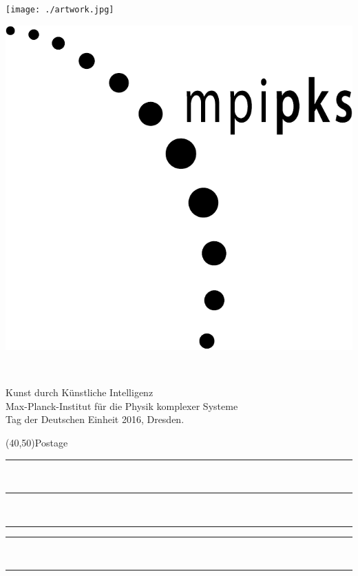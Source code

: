 \documentclass[a6paper,landscape,7pt]{scrartcl}
\begin{document}
\vspace*{-1cm} %
\vspace*{\fill}
\begin{center}
	\texttt{[image: ./artwork.jpg]}
\end{center}
\vfill

\clearpage


\begin{multicols}{2}
    \vspace*{\fill}
    \begin{minipage}{0.12\linewidth}
      \includegraphics[width=\textwidth]{./resources/postcards/MPIPKS_bw.pdf}
    \end{minipage}%
    $\quad$
    \begin{minipage}{0.8\linewidth}
      {\footnotesize
      Kunst durch Künstliche Intelligenz\\
      Max-Planck-Institut für die Physik komplexer Systeme\\
      Tag der Deutschen Einheit 2016, Dresden.
      }
    \end{minipage}%
    \columnbreak\par
    \hfill\framebox(40,50){\scriptsize Postage}\par
    \vspace{0.25\textheight}
    \rule{5.8cm}{0.01cm}\vspace*{1cm}\\ %
    \rule{5.8cm}{0.01cm}\vspace*{1cm}\\ %
    \rule{2.2cm}{0.01cm}\hspace*{0.2cm}\rule{3.4cm}{0.01cm}\vspace*{1cm}\\ %
    \rule{5.8cm}{0.01cm}\\ %
\end{multicols} 
\end{document}
